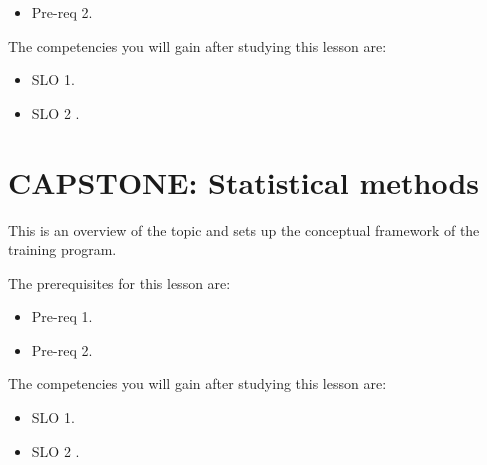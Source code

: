 \begin{itemize}
    \item Pre-req 2.
\end{itemize}




The competencies you will gain after studying this lesson are: 




\begin{itemize}
    \item SLO 1.
\end{itemize}

\begin{itemize}
    \item SLO 2 .
\end{itemize}

\section{CAPSTONE: Statistical methods}
\label{sec:capstone-statistical-methods}

This is an overview of the topic and sets up the conceptual framework of the training program.




The prerequisites for this lesson are: 




\begin{itemize}
    \item Pre-req 1.
\end{itemize}

\begin{itemize}
    \item Pre-req 2.
\end{itemize}




The competencies you will gain after studying this lesson are: 




\begin{itemize}
    \item SLO 1.
\end{itemize}

\begin{itemize}
    \item SLO 2 .
\end{itemize}

